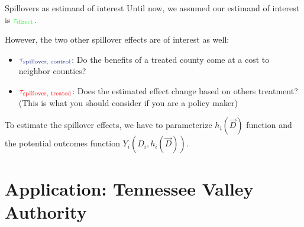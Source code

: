\documentclass[aspectratio=43]{beamer}
\begin{document}







\begin{frame}{Spillovers as estimand of interest}
    Until now, we assumed our estimand of interest is $\textcolor{green}{\tau_{\text{direct}}}$.
    
    However, the two other spillover effects are of interest as well:
    \begin{itemize}
        \item $\textcolor{purple}{\tau_{\text{spillover, control}}}$: Do the benefits of a treated county come at a cost to neighbor counties? 
        
        \item $\textcolor{red}{\tau_{\text{spillover, treated}}}$: Does the estimated effect change based on others treatment? (This is what you should consider if you are a policy maker)
    \end{itemize}
    
    To estimate the spillover effects, we have to parameterize $h_i(\vec{D})$ function and the potential outcomes function $Y_i(D_i, h_i(\vec{D}))$.
\end{frame}






\section{Application: Tennessee Valley Authority}
\end{document}
